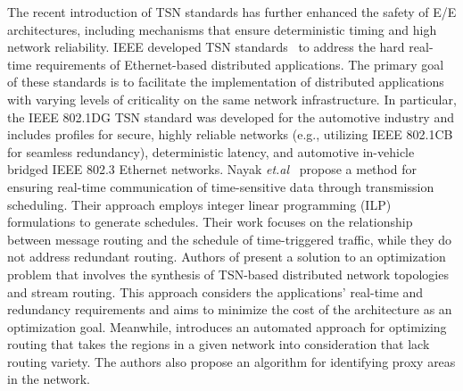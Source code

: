   
 The recent introduction of TSN standards has further enhanced the safety of E/E architectures, including mechanisms that ensure deterministic timing and high network reliability. 
  IEEE developed TSN standards~\cite{TSN} to address the hard real-time requirements of Ethernet-based distributed applications. The primary goal of these standards is to facilitate the implementation of distributed applications with varying levels of criticality on the same network infrastructure. In particular, the IEEE 802.1DG TSN standard was developed for the automotive industry and includes profiles for secure, highly reliable networks (e.g., utilizing IEEE 802.1CB for seamless redundancy), deterministic latency, and automotive in-vehicle bridged IEEE 802.3 Ethernet networks.
   Nayak \emph{et.al}~\cite{nayak2016time} propose a method for ensuring real-time communication of time-sensitive data through transmission scheduling. Their approach employs integer linear programming (ILP) formulations to generate schedules. Their work focuses on the relationship between message routing and the schedule of time-triggered traffic, while they do not address redundant routing.
   Authors of \cite{gavrilut2017fault} present a solution to an optimization problem that involves the synthesis of TSN-based distributed network topologies and stream routing. This approach considers the applications' real-time and redundancy requirements and aims to minimize the cost of the architecture as an optimization goal. Meanwhile, \cite{smirnov2019variety} introduces an automated approach for optimizing routing that takes the regions in a given network into consideration that lack routing variety. The authors also propose an algorithm for identifying proxy areas in the network.



